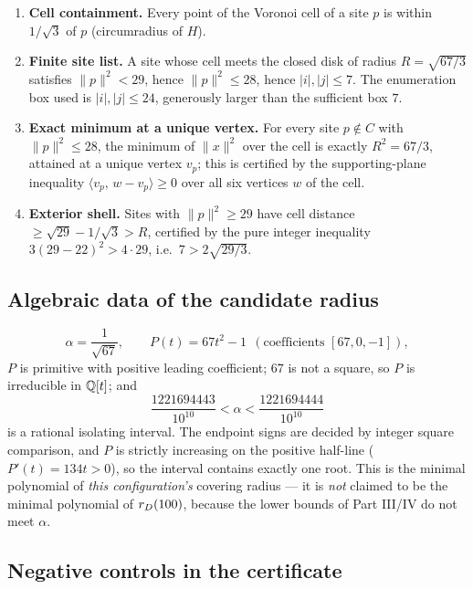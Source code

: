 \begin{enumerate}[leftmargin=1.6em,itemsep=3pt]
\item \textbf{Cell containment.} Every point of the Voronoi cell of a site $p$ is within
$1/\sqrt3$ of $p$ (circumradius of $H$).
\item \textbf{Finite site list.} A site whose cell meets the closed disk of radius $R=\sqrt{67/3}$
satisfies $\|p\|^2<29$, hence $\|p\|^2\le28$, hence $|i|,|j|\le7$. The enumeration box used is
$|i|,|j|\le24$, generously larger than the sufficient box $7$.
\item \textbf{Exact minimum at a unique vertex.} For every site $p\notin C$ with $\|p\|^2\le28$,
the minimum of $\|x\|^2$ over the cell is exactly $R^2=67/3$, attained at a unique vertex $v_p$;
this is certified by the supporting-plane inequality $\langle v_p,\,w-v_p\rangle\ge0$ over all six
vertices $w$ of the cell.
\item \textbf{Exterior shell.} Sites with $\|p\|^2\ge29$ have cell distance
$\ge\sqrt{29}-1/\sqrt3>R$, certified by the pure integer inequality $3(29-22)^2>4\cdot29$, i.e.\
$7>2\sqrt{29/3}$.
\end{enumerate}

\subsection{Algebraic data of the candidate radius}

\[
\alpha=\frac1{\sqrt{67}},\qquad P(t)=67t^2-1 \ \ (\text{coefficients } [67,0,-1]),
\]
$P$ is primitive with positive leading coefficient; $67$ is not a square, so $P$ is irreducible in
$\mathbb{Q}[t]$; and
\[
\frac{1221694443}{10^{10}}<\alpha<\frac{1221694444}{10^{10}}
\]
is a rational isolating interval. The endpoint signs are decided by integer square comparison, and
$P$ is strictly increasing on the positive half-line ($P'(t)=134t>0$), so the interval contains
exactly one root. This is the minimal polynomial of \emph{this configuration's} covering radius ---
it is \emph{not} claimed to be the minimal polynomial of $r_{D}(100)$, because the lower bounds of
Part III/IV do not meet $\alpha$.

\subsection{Negative controls in the certificate}

